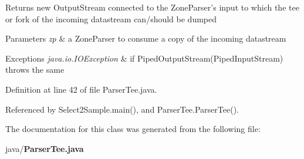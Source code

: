 \begin{DoxyReturn}{Returns}
new Output\+Stream connected to the Zone\+Parser's input to which the tee or fork of the incoming datastream can/should be dumped 
\end{DoxyReturn}

\begin{DoxyParams}{Parameters}
{\em zp} & a Zone\+Parser to consume a copy of the incoming datastream \\
\hline
\end{DoxyParams}

\begin{DoxyExceptions}{Exceptions}
{\em java.\+io.\+I\+O\+Exception} & if Piped\+Output\+Stream(\+Piped\+Input\+Stream) throws the same \\
\hline
\end{DoxyExceptions}


Definition at line 42 of file Parser\+Tee.\+java.



Referenced by Select2\+Sample.\+main(), and Parser\+Tee.\+Parser\+Tee().



The documentation for this class was generated from the following file\+:\begin{DoxyCompactItemize}
\item 
java/{\bf Parser\+Tee.\+java}\end{DoxyCompactItemize}

